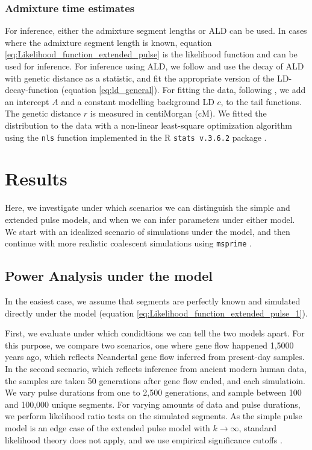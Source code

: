 \documentclass[11pt]{article}
\begin{document}
\subsubsection{Admixture time estimates}\label{admixture time estimates}
For inference, either the admixture segment lengths or ALD can be used. In cases where the admixture segment length is known, equation \ref{eq:Likelihood_function_extended_pulse} is the likelihood function and can be used for inference. For inference using ALD,  we follow \cite{moorjani_history_2011} and use the decay of ALD with genetic distance as a statistic, and fit the appropriate version of the LD-decay-function (equation \ref{eq:ld_general}). For fitting the data, following \cite{moorjani_genetic_2016}, we add an intercept $A$ and a constant modelling background LD $c$, to the tail functions. The genetic distance $r$ is measured in centiMorgan (cM). We fitted the distribution to the data with  a non-linear least-square optimization algorithm using the \texttt{nls} function implemented in the R \texttt{stats v.3.6.2} package \citep{R_Core_Team_2019}.

\section{Results}\label{results}


Here, we investigate under which scenarios we can distinguish the simple and extended pulse models, and when we can infer parameters under either model. 
We start with an idealized scenario of simulations under the model, and then continue with more realistic coalescent simulations using \texttt{msprime} \citep{kelleher_efficient_2016}. 

\subsection{Power Analysis under the model}\label{Power Analysis}
In the easiest case, we assume that segments are perfectly known and simulated directly under the model (equation \ref{eq:Likelihood_function_extended_pulse_1}).

First, we evaluate under which condidtions we can tell the two models apart. For this purpose, we compare two scenarios, one where gene flow happened 1,5000 years ago, which reflects Neandertal gene flow inferred from present-day samples. In the second scenario, which reflects inference from ancient modern human data, the samples are taken 50 generations after gene flow ended, and each simulatioin.  We vary pulse durations from one to 2,500 generations, and sample between 100 and 100,000 unique segments. For varying amounts of data and pulse durations, we perform likelihood ratio tests on the simulated segments. As the simple pulse model is an edge case of the extended pulse model with $k\to \infty$, standard likelihood theory does not apply, and we use empirical significance cutoffs \citep{Kozubowski_Testing_2008}.
\end{document}
